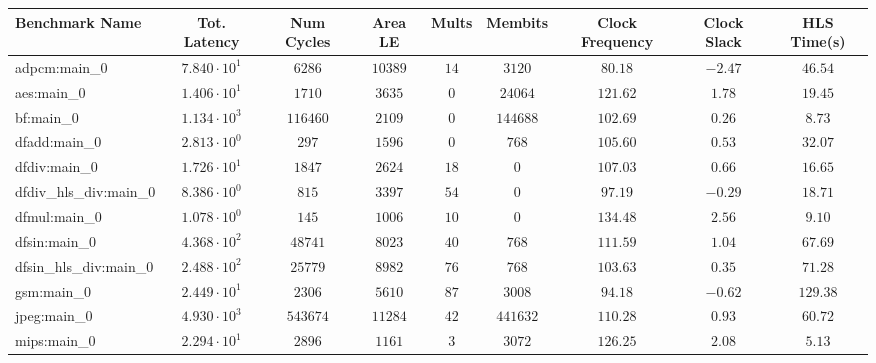 \begin{tabular}{|l|c|c|c|c|c|c|c|c|}
\hline
Benchmark Name          & Tot. Latency           & Num Cycles & Area LE   & Mults   & Membits    & Clock Frequency & Clock Slack & HLS Time(s) \\
\hline
adpcm:main\_0           & $ 7.840 \cdot 10^{1} $ & $ 6286   $ & $ 10389 $ & $ 14  $ & $ 3120   $ & $ 80.18       $ & $ -2.47   $ & $ 46.54   $ \\
aes:main\_0             & $ 1.406 \cdot 10^{1} $ & $ 1710   $ & $ 3635  $ & $ 0   $ & $ 24064  $ & $ 121.62      $ & $ 1.78    $ & $ 19.45   $ \\
bf:main\_0              & $ 1.134 \cdot 10^{3} $ & $ 116460 $ & $ 2109  $ & $ 0   $ & $ 144688 $ & $ 102.69      $ & $ 0.26    $ & $ 8.73    $ \\
dfadd:main\_0           & $ 2.813 \cdot 10^{0} $ & $ 297    $ & $ 1596  $ & $ 0   $ & $ 768    $ & $ 105.60      $ & $ 0.53    $ & $ 32.07   $ \\
dfdiv:main\_0           & $ 1.726 \cdot 10^{1} $ & $ 1847   $ & $ 2624  $ & $ 18  $ & $ 0      $ & $ 107.03      $ & $ 0.66    $ & $ 16.65   $ \\
dfdiv\_hls\_div:main\_0 & $ 8.386 \cdot 10^{0} $ & $ 815    $ & $ 3397  $ & $ 54  $ & $ 0      $ & $ 97.19       $ & $ -0.29   $ & $ 18.71   $ \\
dfmul:main\_0           & $ 1.078 \cdot 10^{0} $ & $ 145    $ & $ 1006  $ & $ 10  $ & $ 0      $ & $ 134.48      $ & $ 2.56    $ & $ 9.10    $ \\
dfsin:main\_0           & $ 4.368 \cdot 10^{2} $ & $ 48741  $ & $ 8023  $ & $ 40  $ & $ 768    $ & $ 111.59      $ & $ 1.04    $ & $ 67.69   $ \\
dfsin\_hls\_div:main\_0 & $ 2.488 \cdot 10^{2} $ & $ 25779  $ & $ 8982  $ & $ 76  $ & $ 768    $ & $ 103.63      $ & $ 0.35    $ & $ 71.28   $ \\
gsm:main\_0             & $ 2.449 \cdot 10^{1} $ & $ 2306   $ & $ 5610  $ & $ 87  $ & $ 3008   $ & $ 94.18       $ & $ -0.62   $ & $ 129.38  $ \\
jpeg:main\_0            & $ 4.930 \cdot 10^{3} $ & $ 543674 $ & $ 11284 $ & $ 42  $ & $ 441632 $ & $ 110.28      $ & $ 0.93    $ & $ 60.72   $ \\
mips:main\_0            & $ 2.294 \cdot 10^{1} $ & $ 2896   $ & $ 1161  $ & $ 3   $ & $ 3072   $ & $ 126.25      $ & $ 2.08    $ & $ 5.13    $ \\

\end{tabular}
